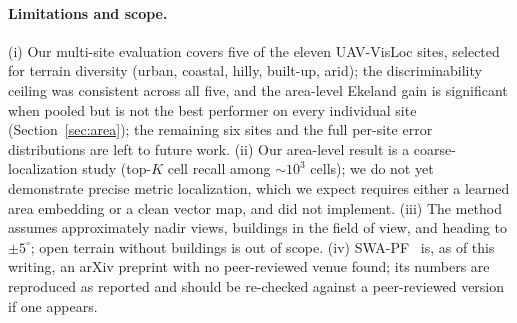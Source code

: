 \documentclass[10pt]{article}
\theoremstyle{plain}
\theoremstyle{definition}
\begin{document}
\paragraph{Limitations and scope.}
(i) Our multi-site evaluation covers five of the eleven UAV-VisLoc sites,
selected for terrain diversity (urban, coastal, hilly, built-up, arid); the
discriminability ceiling was consistent across all five, and the area-level
Ekeland gain is significant when pooled but is not the best performer on
every individual site (Section~\ref{sec:area}); the remaining six sites and
the full per-site error distributions are left to future work.
(ii) Our area-level result is a coarse-localization study (top-$K$ cell recall
among ${\sim}10^{3}$ cells); we do not yet demonstrate precise metric
localization, which we expect requires either a learned area embedding or a
clean vector map, and did not implement.
(iii) The method assumes approximately nadir views, buildings in the field of
view, and heading to $\pm5^\circ$; open terrain without buildings is out of
scope.
(iv) SWA-PF~\cite{yuan2025swapf} is, as of this writing, an arXiv preprint with
no peer-reviewed venue found; its numbers are reproduced as reported and should
be re-checked against a peer-reviewed version if one appears.

\FloatBarrier


\end{document}
